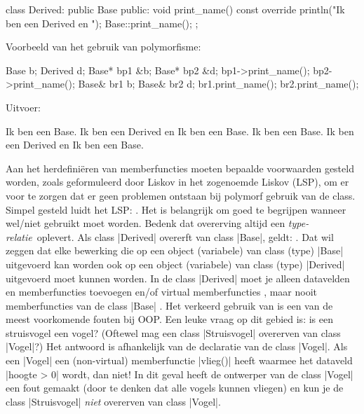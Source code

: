 \begin{cpplstShortInline}
\begin{cpplstfragment}
class Derived: public Base {
public:
    void print_name() const override {
        println("Ik ben een Derived en ");
        Base::print_name();
    }
};
\end{cpplstfragment}

Voorbeeld van het gebruik van polymorfisme:
\begin{cpplstfragment}
Base b;
Derived d;
Base* bp1 {&b};
Base* bp2 {&d};
bp1->print_name();
bp2->print_name();
Base& br1 {b};
Base& br2 {d};
br1.print_name();
br2.print_name();
\end{cpplstfragment}

Uitvoer:
\begin{coutput}
Ik ben een Base.
Ik ben een Derived en Ik ben een Base.
Ik ben een Base.
Ik ben een Derived en Ik ben een Base.
\end{coutput}

Aan het herdefiniëren van memberfuncties moeten bepaalde voorwaarden gesteld worden, zoals geformuleerd door Liskov\cite{Liskov1994} in het zogenoemde Liskov  (LSP), om er voor te zorgen dat er geen problemen ontstaan bij polymorf gebruik van de class.
Simpel gesteld luidt het LSP: .
Het is belangrijk om goed te begrijpen wanneer  wel/niet gebruikt moet worden.
Bedenk dat overerving altijd een \emph{type-relatie}\ oplevert.
Als class |Derived| overerft van class |Base|, geldt: . 
Dat wil zeggen dat elke bewerking die op een object (variabele) van class (type) |Base| uitgevoerd kan worden ook op een object (variabele) van class (type) |Derived| uitgevoerd moet kunnen worden.
In de class |Derived| moet je alleen datavelden en memberfuncties toevoegen en/of virtual memberfuncties , maar nooit memberfuncties van de class |Base| .
Het verkeerd gebruik van  is een van de meest voorkomende fouten bij OOP\@.
Een leuke vraag op dit gebied is: is een struisvogel een vogel? (Oftewel mag een class |Struisvogel| overerven van class |Vogel|?) 
Het antwoord is afhankelijk van de declaratie van de class |Vogel|.
Als een |Vogel| een (non-virtual) memberfunctie |vlieg()| heeft waarmee het dataveld |hoogte > 0| wordt, dan niet! 
In dit geval heeft de ontwerper van de class |Vogel| een fout gemaakt (door te denken dat alle vogels kunnen vliegen) en kun je de class |Struisvogel| \emph{niet} overerven van class |Vogel|.


\end{cpplstShortInline}

